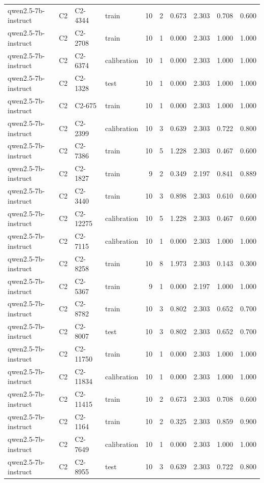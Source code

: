 \begin{table}
\begin{tabular}{llllrrrrrr}
qwen2.5-7b-instruct & C2 & C2-4344 & train & 10 & 2 & 0.673 & 2.303 & 0.708 & 0.600 \\
qwen2.5-7b-instruct & C2 & C2-2708 & train & 10 & 1 & 0.000 & 2.303 & 1.000 & 1.000 \\
qwen2.5-7b-instruct & C2 & C2-6374 & calibration & 10 & 1 & 0.000 & 2.303 & 1.000 & 1.000 \\
qwen2.5-7b-instruct & C2 & C2-1328 & test & 10 & 1 & 0.000 & 2.303 & 1.000 & 1.000 \\
qwen2.5-7b-instruct & C2 & C2-675 & train & 10 & 1 & 0.000 & 2.303 & 1.000 & 1.000 \\
qwen2.5-7b-instruct & C2 & C2-2399 & calibration & 10 & 3 & 0.639 & 2.303 & 0.722 & 0.800 \\
qwen2.5-7b-instruct & C2 & C2-7386 & train & 10 & 5 & 1.228 & 2.303 & 0.467 & 0.600 \\
qwen2.5-7b-instruct & C2 & C2-1827 & train & 9 & 2 & 0.349 & 2.197 & 0.841 & 0.889 \\
qwen2.5-7b-instruct & C2 & C2-3440 & train & 10 & 3 & 0.898 & 2.303 & 0.610 & 0.600 \\
qwen2.5-7b-instruct & C2 & C2-12275 & calibration & 10 & 5 & 1.228 & 2.303 & 0.467 & 0.600 \\
qwen2.5-7b-instruct & C2 & C2-7115 & calibration & 10 & 1 & 0.000 & 2.303 & 1.000 & 1.000 \\
qwen2.5-7b-instruct & C2 & C2-8258 & train & 10 & 8 & 1.973 & 2.303 & 0.143 & 0.300 \\
qwen2.5-7b-instruct & C2 & C2-5367 & train & 9 & 1 & 0.000 & 2.197 & 1.000 & 1.000 \\
qwen2.5-7b-instruct & C2 & C2-8782 & train & 10 & 3 & 0.802 & 2.303 & 0.652 & 0.700 \\
qwen2.5-7b-instruct & C2 & C2-8007 & test & 10 & 3 & 0.802 & 2.303 & 0.652 & 0.700 \\
qwen2.5-7b-instruct & C2 & C2-11750 & train & 10 & 1 & 0.000 & 2.303 & 1.000 & 1.000 \\
qwen2.5-7b-instruct & C2 & C2-11834 & calibration & 10 & 1 & 0.000 & 2.303 & 1.000 & 1.000 \\
qwen2.5-7b-instruct & C2 & C2-11415 & train & 10 & 2 & 0.673 & 2.303 & 0.708 & 0.600 \\
qwen2.5-7b-instruct & C2 & C2-1164 & train & 10 & 2 & 0.325 & 2.303 & 0.859 & 0.900 \\
qwen2.5-7b-instruct & C2 & C2-7649 & calibration & 10 & 1 & 0.000 & 2.303 & 1.000 & 1.000 \\
qwen2.5-7b-instruct & C2 & C2-8955 & test & 10 & 3 & 0.639 & 2.303 & 0.722 & 0.800 \\

\end{tabular}
\end{table}
